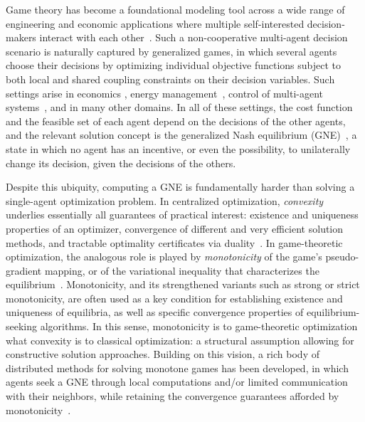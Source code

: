 \documentclass[11pt, a4paper]{article}
\theoremstyle{remark}
\theoremstyle{plain}
\begin{document}
Game theory has become a foundational modeling tool across a wide range of engineering and economic applications where multiple self-interested decision-makers interact with each other~\cite{BYGP22}. Such a non-cooperative multi-agent decision scenario is naturally captured by generalized games, in which several agents choose their decisions by optimizing individual objective functions subject to both local and shared coupling constraints on their decision variables. Such settings arise in economics \cite{Dockner_GameEco_2000}, energy management~\cite{Hall_CDC_2022,LJWA20,WLMCMWW21}, control of multi-agent systems~\cite{Cappello_TCNS_2021}, and in many other domains.
In all of these settings, the cost function and the feasible set of each agent depend on the decisions of the other agents, and the relevant solution concept is the generalized Nash equilibrium (GNE)~\cite{facchinei2010generalized,Bau16}, a state in which no agent has an incentive, or even the possibility, to unilaterally change its decision, given the decisions of the others. 

Despite this ubiquity, computing a GNE is fundamentally harder than solving a single-agent optimization problem. In centralized optimization, {\it convexity} underlies essentially all guarantees of practical interest: existence and uniqueness properties of an optimizer, convergence of different and very efficient solution methods, and tractable optimality certificates via duality~\cite{BV04}. In game-theoretic optimization, the analogous role is played by {\it monotonicity} of the game's pseudo-gradient mapping, or of the variational inequality that characterizes the equilibrium~\cite{facchinei2010generalized}. Monotonicity, and its strengthened variants such as strong or strict monotonicity, are often used as a key condition for establishing existence and uniqueness of equilibria, as well as specific convergence properties of equilibrium-seeking algorithms.
In this sense, monotonicity is to game-theoretic optimization what convexity is to classical optimization: a structural assumption allowing for constructive solution approaches. Building on this vision, a rich body of distributed methods for solving monotone games has been developed, in which agents seek a GNE through local computations and/or limited communication with their neighbors, while retaining the convergence guarantees afforded by monotonicity~\cite{belgioioso2020, TatKam25, TatNed25}.
\end{document}
